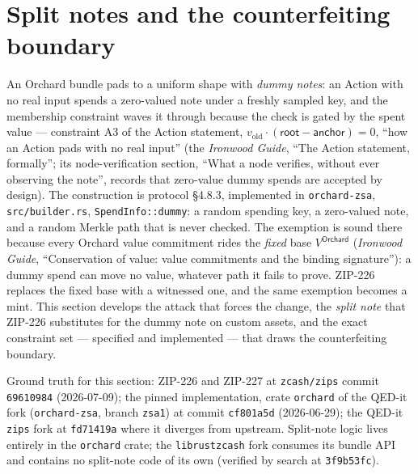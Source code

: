 \documentclass[11pt,a4paper]{article}
\theoremstyle{definition}
\begin{document}

\section{Split notes and the counterfeiting boundary}\label{sec:zsa-split}

An Orchard bundle pads to a uniform shape with \emph{dummy notes}: an Action
with no real input spends a zero-valued note under a freshly sampled key,
and the membership constraint waves it through because the check is gated by
the spent value --- constraint A3 of the Action statement,
$v_{\mathrm{old}} \cdot (\mathsf{root} - \mathsf{anchor}) = 0$, ``how an
Action pads with no real input'' (the \emph{Ironwood Guide}, ``The Action
statement, formally''; its node-verification section, ``What a node
verifies, without ever observing the note'', records that zero-value dummy
spends are accepted by design). The construction is protocol \S4.8.3,
implemented in \texttt{orchard-zsa}, \texttt{src/builder.rs},
\texttt{SpendInfo::dummy}: a random spending key, a zero-valued note, and a
random Merkle path that is never checked. The exemption is sound there
because every Orchard value commitment rides the \emph{fixed} base
$V^{\mathsf{Orchard}}$ (\emph{Ironwood Guide}, ``Conservation of value:
value commitments and the binding signature''): a dummy spend can move no
value, whatever path it fails to prove. ZIP-226 replaces the fixed base
with a witnessed one, and the same exemption becomes a mint. This section
develops the attack that forces the change, the \emph{split note} that
ZIP-226 substitutes for the dummy note on custom assets, and the exact
constraint set --- specified and implemented --- that draws the
counterfeiting boundary.

Ground truth for this section: ZIP-226 and ZIP-227 at \texttt{zcash/zips}
commit \texttt{69610984} (2026-07-09); the pinned implementation, crate
\texttt{orchard} of the QED-it fork (\texttt{orchard-zsa}, branch
\texttt{zsa1}) at commit \texttt{cf801a5d} (2026-06-29); the QED-it
\texttt{zips} fork at \texttt{fd71419a} where it diverges from upstream.
Split-note logic lives entirely in the \texttt{orchard} crate; the
\texttt{librustzcash} fork consumes its bundle API and contains no
split-note code of its own (verified by search at \texttt{3f9b53fc}).
\end{document}
